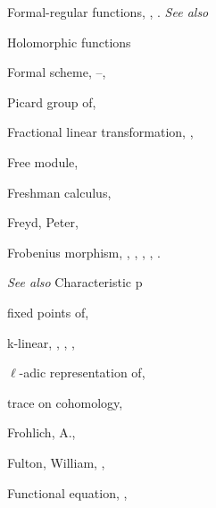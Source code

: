 {{\noindent\hspace*{0.0bp}Formal-regular functions, , . \emph{See also}\par
\noindent\hspace*{15.0bp}Holomorphic functions\par
\noindent\hspace*{0.0bp}Formal scheme, --, \par
\noindent\hspace*{7.5bp}Picard group of, \par
\noindent\hspace*{0.0bp}Fractional linear transformation, , \par
\noindent\hspace*{0.0bp}Free module, \par
\noindent\hspace*{0.0bp}Freshman calculus, \par
\noindent\hspace*{0.0bp}Freyd, Peter, \par
\noindent\hspace*{0.0bp}Frobenius morphism, , , , , .\par
\noindent\hspace*{15.0bp}\emph{See also} Characteristic p\par
\noindent\hspace*{7.5bp}fixed points of, \par
\noindent\hspace*{7.5bp}k-linear, , , , \par
\noindent\hspace*{7.5bp}$\ell$-adic representation of, \par
\noindent\hspace*{7.5bp}trace on cohomology, \par
\noindent\hspace*{0.0bp}Frohlich, A., \par
\noindent\hspace*{0.0bp}Fulton, William, , \par
\noindent\hspace*{0.0bp}Functional equation, , \par
}}
